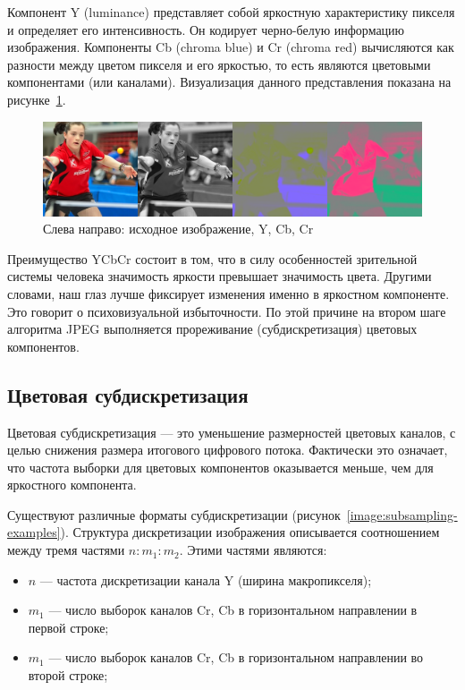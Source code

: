 \documentclass[times,specification,annotation]{itmo-student-thesis}
\begin{document}
Компонент Y (luminance) представляет собой яркостную характеристику пикселя и определяет его интенсивность. Он кодирует черно-белую информацию изображения. Компоненты Cb (chroma blue) и Cr (chroma red) вычисляются как разности между цветом пикселя и его яркостью, то есть являются цветовыми компонентами (или каналами). Визуализация данного представления показана на рисунке~\ref{image:yuv-example}.\par

\begin{figure}[!h]
    \centering
    \includegraphics[width=\textwidth]{./images/yuv-example.png}
    \caption{Слева направо: исходное изображение, Y, Cb, Cr}
    \label{image:yuv-example}
\end{figure}

Преимущество YCbCr состоит в том, что в силу особенностей зрительной системы человека значимость яркости превышает значимость цвета. Другими словами, наш глаз лучше фиксирует изменения именно в яркостном компоненте. Это говорит о психовизуальной избыточности. По этой причине на втором шаге алгоритма JPEG выполняется прореживание (субдискретизация) цветовых компонентов.

\subsection{Цветовая субдискретизация}\label{subsec:chroma-subsampling}

Цветовая субдискретизация --- это уменьшение размерностей цветовых каналов, с целью снижения размера итогового цифрового потока. Фактически это означает, что частота выборки для цветовых компонентов оказывается меньше, чем для яркостного компонента.\par

Существуют различные форматы субдискретизации (рисунок~\ref{image:subsampling-examples}). Структура дискретизации изображения описывается соотношением между тремя частями $n:m_1:m_2$. Этими частями являются:
\begin{itemize}
    \item $n$ --- частота дискретизации канала Y (ширина макропикселя);
    \item $m_1$ --- число выборок каналов Cr, Cb в горизонтальном направлении в первой строке;
    \item $m_1$ --- число выборок каналов Cr, Cb в горизонтальном направлении во второй строке;
\end{itemize}
\end{document}
